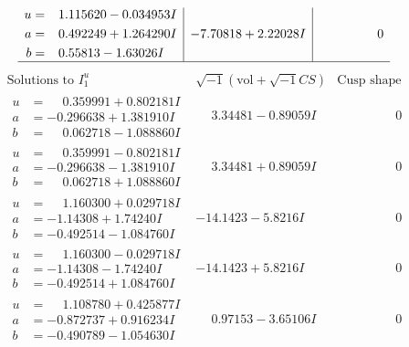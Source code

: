 \documentclass[1p]{elsarticle_modified}
\theoremstyle{definition}
\newcommand{\I}{\sqrt{-1}}
\begin{document}
$$\begin{array}{c|c|c}
\begin{aligned}
u &= \phantom{-}1.115620 - 0.034953 I \\
a &= \phantom{-}0.492249 + 1.264290 I \\
b &= \phantom{-}0.55813 - 1.63026 I\end{aligned}
 & -7.70818 + 2.22028 I & \phantom{-0.000000 } 0\\
 \hline 
 \end{array}$$\newpage$$\begin{array}{c|c|c}  
\text{Solutions to }I^u_{1}& \I (\text{vol} + \sqrt{-1}CS) & \text{Cusp shape}\\
 \hline 
\begin{aligned}
u &= \phantom{-}0.359991 + 0.802181 I \\
a &= -0.296638 + 1.381910 I \\
b &= \phantom{-}0.062718 - 1.088860 I\end{aligned}
 & \phantom{-}3.34481 - 0.89059 I & \phantom{-0.000000 } 0 \\ \hline\begin{aligned}
u &= \phantom{-}0.359991 - 0.802181 I \\
a &= -0.296638 - 1.381910 I \\
b &= \phantom{-}0.062718 + 1.088860 I\end{aligned}
 & \phantom{-}3.34481 + 0.89059 I & \phantom{-0.000000 } 0 \\ \hline\begin{aligned}
u &= \phantom{-}1.160300 + 0.029718 I \\
a &= -1.14308 + 1.74240 I \\
b &= -0.492514 - 1.084760 I\end{aligned}
 & -14.1423 - 5.8216 I & \phantom{-0.000000 } 0 \\ \hline\begin{aligned}
u &= \phantom{-}1.160300 - 0.029718 I \\
a &= -1.14308 - 1.74240 I \\
b &= -0.492514 + 1.084760 I\end{aligned}
 & -14.1423 + 5.8216 I & \phantom{-0.000000 } 0 \\ \hline\begin{aligned}
u &= \phantom{-}1.108780 + 0.425877 I \\
a &= -0.872737 + 0.916234 I \\
b &= -0.490789 - 1.054630 I\end{aligned}
 & \phantom{-}0.97153 - 3.65106 I & \phantom{-0.000000 } 0 \\ \hline\begin{aligned}

\end{aligned}
\end{array}$$
\end{document}
